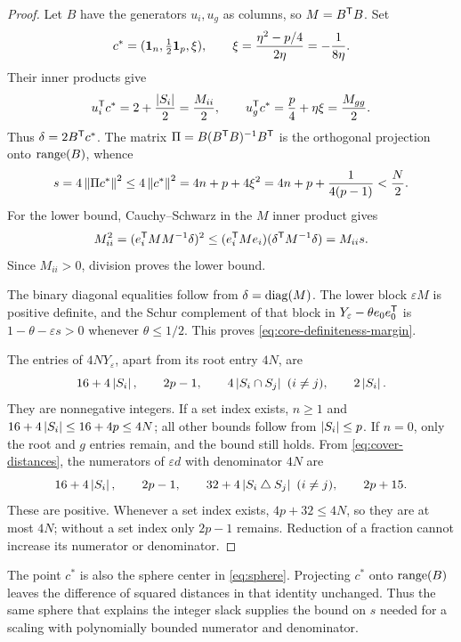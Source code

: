 \begin{proof}
Let $B$ have the generators $u_i,u_g$ as columns, so $M=B^{\mathsf T} B$.
Set
\[
  c^*=(\mathbf 1_n,\tfrac12\mathbf 1_p,\xi),\qquad
  \xi=\frac{\eta^2-p/4}{2\eta}=-\frac1{8\eta}.
\]
Their inner products give
\[
  u_i^{\mathsf T} c^*=2+\frac{\left\lvert S_i\right\rvert}2=\frac{M_{ii}}2,
  \qquad
  u_g^{\mathsf T} c^*=\frac p4+\eta\xi=\frac{M_{gg}}2.
\]
Thus $\delta=2B^{\mathsf T} c^*$.  The matrix
$\Pi=B(B^{\mathsf T} B)^{-1}B^{\mathsf T}$ is the orthogonal projection onto
$\operatorname{range}(B)$, whence
\[
  s=4\left\lVert \Pi c^*\right\rVert^2
    \leq4\left\lVert c^*\right\rVert^2
    =4n+p+4\xi^2
    =4n+p+\frac1{4(p-1)}<\frac N2.
\]
For the lower bound, Cauchy--Schwarz in the $M$ inner product gives
\[
  M_{ii}^2
  =(e_i^{\mathsf T} M M^{-1}\delta)^2
  \leq(e_i^{\mathsf T} M e_i)(\delta^{\mathsf T} M^{-1}\delta)
  =M_{ii}s.
\]
Since $M_{ii}>0$, division proves the lower bound.

The binary diagonal equalities follow from $\delta=\operatorname{diag}(M)$.
The lower block $\varepsilon M$ is positive definite, and the Schur
complement of that block in
$Y_\varepsilon-\theta e_0e_0^{\mathsf T}$ is
$1-\theta-\varepsilon s>0$ whenever $\theta\leq1/2$.
This proves \eqref{eq:core-definiteness-margin}.

The entries of $4N Y_\varepsilon$, apart from its root entry $4N$, are
\[
  16+4\left\lvert S_i\right\rvert,\qquad 2p-1,\qquad
  4\left\lvert S_i\cap S_j\right\rvert\ (i\ne j),\qquad 2\left\lvert S_i\right\rvert.
\]
They are nonnegative integers.  If a set index exists, $n\geq1$ and
$16+4\left\lvert S_i\right\rvert\leq16+4p\leq4N$; all other bounds follow from
$\left\lvert S_i\right\rvert\leq p$.  If $n=0$, only the root and $g$ entries remain, and
the bound still holds.  From \eqref{eq:cover-distances}, the numerators of
$\varepsilon d$ with denominator $4N$ are
\[
  16+4\left\lvert S_i\right\rvert,\qquad 2p-1,\qquad
  32+4\left\lvert S_i\mathbin{\triangle} S_j\right\rvert\ (i\ne j),\qquad 2p+15.
\]
These are positive.  Whenever a set index exists,
$4p+32\leq4N$, so they are at most $4N$; without a set index only
$2p-1$ remains.  Reduction of a fraction cannot increase its numerator or
denominator.
\end{proof}

The point $c^*$ is also the sphere center in \eqref{eq:sphere}.
Projecting $c^*$ onto $\operatorname{range}(B)$ leaves the difference of squared
distances in that identity unchanged.
Thus the same sphere that explains the integer slack supplies the bound
on $s$ needed for a scaling with polynomially bounded numerator and
denominator.

